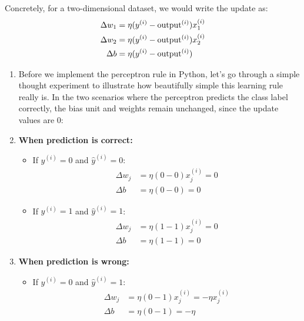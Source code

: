 \documentclass[../machine_learning_scikit.tex]{subfiles}
\begin{document}
    \begin{exa}
        Concretely, for a two-dimensional dataset, we would write the update as:
        \begin{equation*}
            \begin{split}
                \Delta w_1&=\eta(y^{(i)}-\textup{output}^{(i)})x_1^{(i)}\\
                \Delta w_2&=\eta(y^{(i)}-\textup{output}^{(i)})x_2^{(i)}\\
                \Delta b&=\eta(y^{(i)}-\textup{output}^{(i)})\\
            \end{split}
        \end{equation*}
    \end{exa}

    \begin{enumerate}
        \item Before we implement the perceptron rule in Python, let's go through a simple thought experiment to illustrate how beautifully simple this learning rule really is. In the two scenarios where the perceptron predicts the class label correctly, the bias unit and weights remain unchanged, since the update values are 0:

        \item \textbf{When prediction is correct:}
        \begin{itemize}
            \item If $y^{(i)} = 0$ and $\hat{y}^{(i)} = 0$:
            \begin{align*}
            \Delta w_j &= \eta(0 - 0)x_j^{(i)} = 0 \\
            \Delta b &= \eta(0 - 0) = 0
            \end{align*}
            
            \item If $y^{(i)} = 1$ and $\hat{y}^{(i)} = 1$:
            \begin{align*}
            \Delta w_j &= \eta(1 - 1)x_j^{(i)} = 0 \\
            \Delta b &= \eta(1 - 1) = 0
            \end{align*}
        \end{itemize}

        \item \textbf{When prediction is wrong:}
        \begin{itemize}
            \item If $y^{(i)} = 0$ and $\hat{y}^{(i)} = 1$:
            \begin{align*}
            \Delta w_j &= \eta(0 - 1)x_j^{(i)} = -\eta x_j^{(i)} \\
            \Delta b &= \eta(0 - 1) = -\eta
            \end{align*}
            

\end{itemize}
\end{enumerate}
\end{document}
